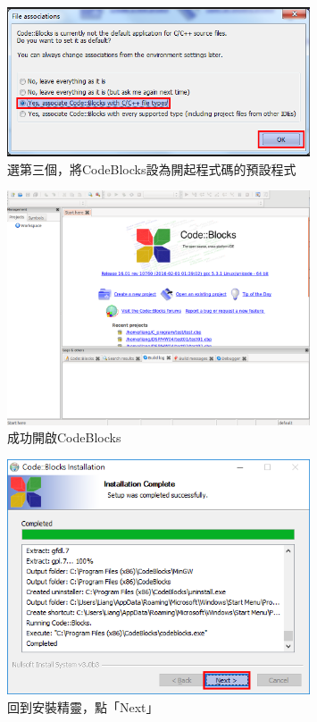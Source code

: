 		\begin{figure}[H]
			\centering
			\includegraphics[width=0.8\textwidth]{fig/install_and_setting/install_012_setup09}
			\caption{選第三個，將CodeBlocks設為開起程式碼的預設程式}
		\end{figure}
		
		\begin{figure}[H]
			\centering
			\includegraphics[width=0.8\textwidth]{fig/install_and_setting/install_013_setup10}
			\caption{成功開啟CodeBlocks}
		\end{figure}
		
		\begin{figure}[H]
			\centering
			\includegraphics[width=0.8\textwidth]{fig/install_and_setting/install_014_setup11}
			\caption{回到安裝精靈，點「Next」}
		\end{figure}
		
